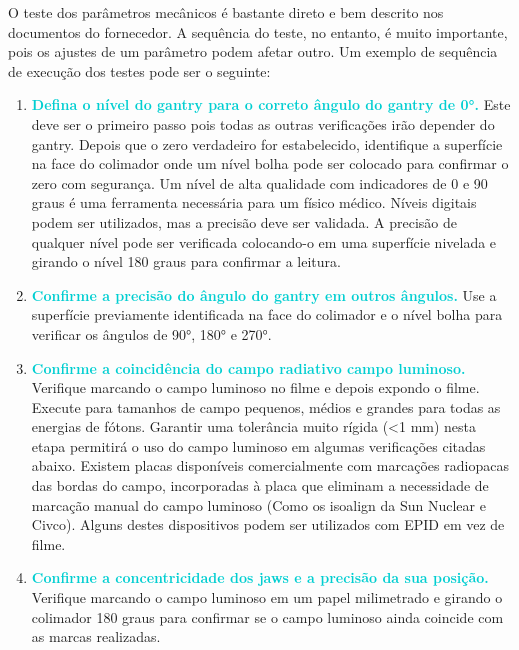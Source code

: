 \documentclass[11pt,a4paper]{article}
\newcounter{exemplo}
\begin{document}
	O teste dos parâmetros mecânicos é bastante direto e bem descrito nos documentos do fornecedor. A sequência do teste, no entanto, é muito importante, pois os ajustes de um parâmetro podem afetar outro. Um exemplo de sequência de execução dos testes pode ser o seguinte:

	\begin{enumerate}[label=\textcolor{CarnationPink}{\arabic*${}^\circ $}]
		\item \textcolor{DarkTurquoise}{\textbf{Defina o nível do gantry para o correto ângulo do gantry de \ang{0}.}} Este deve ser o primeiro passo pois todas as outras verificações irão depender do gantry. Depois que o zero verdadeiro for estabelecido, identifique a superfície na face do colimador onde um nível bolha pode ser colocado para confirmar o zero com segurança. Um nível de alta qualidade com indicadores de 0 e 90 graus é uma ferramenta necessária para um físico médico. Níveis digitais podem ser utilizados, mas a precisão deve ser validada. A precisão de qualquer nível pode ser verificada colocando-o em uma superfície nivelada e girando o nível 180 graus para confirmar a leitura.
		
		\item \textcolor{DarkTurquoise}{\textbf{Confirme a precisão do ângulo do gantry em outros ângulos.}} Use a superfície previamente identificada na face do colimador e o nível bolha para verificar os ângulos de \ang{90}, \ang{180} e \ang{270}.
		
		\item \textcolor{DarkTurquoise}{\textbf{Confirme a coincidência do campo radiativo campo luminoso.}} Verifique marcando o campo luminoso no filme e depois expondo o filme. Execute para tamanhos de campo pequenos, médios e grandes para todas as energias de fótons. Garantir uma tolerância muito rígida (<1 mm) nesta etapa permitirá o uso do campo luminoso em algumas verificações citadas abaixo. Existem placas disponíveis comercialmente com marcações radiopacas das bordas do campo, incorporadas à placa que eliminam a necessidade de marcação manual do campo luminoso (Como os isoalign da Sun Nuclear e Civco). Alguns destes dispositivos podem ser utilizados com EPID em vez de filme.
		
		\item \textcolor{DarkTurquoise}{\textbf{Confirme a concentricidade dos jaws e a precisão da sua posição.}} Verifique marcando o campo luminoso em um papel milimetrado e girando o colimador 180 graus para confirmar se o campo luminoso ainda coincide com as marcas realizadas.
		

\end{enumerate}
\end{document}
